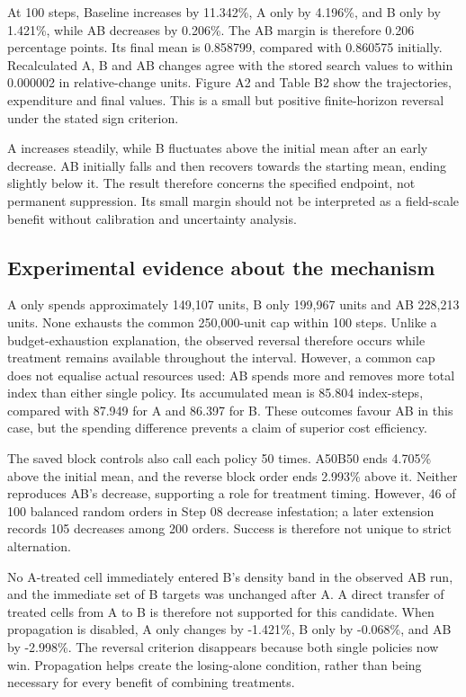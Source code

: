 \documentclass[a4paper,11pt]{article}
\begin{document}
At 100 steps, Baseline increases by 11.342\%, A only by 4.196\%, and B only by 1.421\%, while AB decreases by 0.206\%. The AB margin is therefore 0.206 percentage points. Its final mean is 0.858799, compared with 0.860575 initially. Recalculated A, B and AB changes agree with the stored search values to within 0.000002 in relative-change units. Figure A2 and Table B2 show the trajectories, expenditure and final values. This is a small but positive finite-horizon reversal under the stated sign criterion.

A increases steadily, while B fluctuates above the initial mean after an early decrease. AB initially falls and then recovers towards the starting mean, ending slightly below it. The result therefore concerns the specified endpoint, not permanent suppression. Its small margin should not be interpreted as a field-scale benefit without calibration and uncertainty analysis.

\subsection{Experimental evidence about the mechanism}

A only spends approximately 149,107 units, B only 199,967 units and AB 228,213 units. None exhausts the common 250,000-unit cap within 100 steps. Unlike a budget-exhaustion explanation, the observed reversal therefore occurs while treatment remains available throughout the interval. However, a common cap does not equalise actual resources used: AB spends more and removes more total index than either single policy. Its accumulated mean is 85.804 index-steps, compared with 87.949 for A and 86.397 for B. These outcomes favour AB in this case, but the spending difference prevents a claim of superior cost efficiency.

The saved block controls also call each policy 50 times. A50B50 ends 4.705\% above the initial mean, and the reverse block order ends 2.993\% above it. Neither reproduces AB's decrease, supporting a role for treatment timing. However, 46 of 100 balanced random orders in Step 08 decrease infestation; a later extension records 105 decreases among 200 orders. Success is therefore not unique to strict alternation.

No A-treated cell immediately entered B's density band in the observed AB run, and the immediate set of B targets was unchanged after A. A direct transfer of treated cells from A to B is therefore not supported for this candidate. When propagation is disabled, A only changes by -1.421\%, B only by -0.068\%, and AB by -2.998\%. The reversal criterion disappears because both single policies now win. Propagation helps create the losing-alone condition, rather than being necessary for every benefit of combining treatments.
\end{document}
